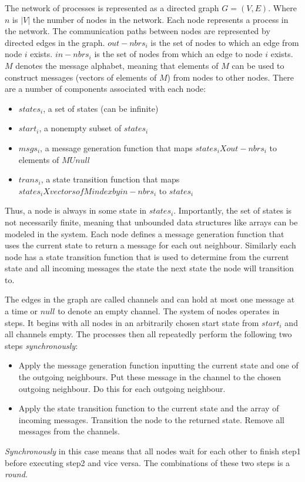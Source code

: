 \documentclass[fleqn]{article}
\begin{document}
The network of processes is represented as a directed graph $G=(V,E)$. Where $n$ is $|V|$ the number of nodes in the network. Each node represents a process in the network.
The communication paths between nodes are represented by directed edges in the graph.
$out-nbrs_i$ is the set of nodes to which an edge from node $i$ exists.
$in-nbrs_i$ is the set of nodes from which an edge to node $i$ exists.
$M$ denotes the message alphabet, meaning that elements of $M$ can be used to construct messages (vectors of elements of $M$) from nodes to other nodes.
There are a number of components associated with each node:
\begin{itemize}
    \item $states_i$, a set of states (can be infinite)
    \item $start_i$, a nonempty subset of $states_i$
    \item $msgs_i$, a message generation function that maps $states_i X out-nbrs_i$ to elements of $M U {null}$
    \item $trans_i$, a state transition function that maps $states_i X vectors of M index by in-nbrs_i$ to $states_i$
\end{itemize}
Thus, a node is always in some state in $states_i$. Importantly, the set of states is not necessarily finite, meaning that unbounded data structures like arrays can be modeled in the system.
Each node defines a message generation function that uses the current state to return a message for each out neighbour. Similarly each node has a state transition function that is used to determine
from the current state and all incoming messages the state the next state the node will transition to.

The edges in the graph are called channels and can hold at most one message at a time or $null$ to denote an empty channel.
The system of nodes operates in steps. It begins with all nodes in an arbitrarily chosen start state from $start_i$ and all channels empty.
The processes then all repeatedly perform the following two steps \textit{synchronously}:
\begin{itemize}
  \item Apply the message generation function inputting the current state and one of the outgoing neighbours. Put these message in the channel to the chosen outgoing neighbour. Do this for each outgoing neighbour.
  \item Apply the state transition function to the current state and the array of incoming messages. Transition the node to the returned state. Remove all messages from the channels.
\end{itemize}
\textit{Synchronously} in this case means that all nodes wait for each other to finish step1 before executing step2 and vice versa.
The combinations of these two steps is a \textit{round}.
\end{document}
